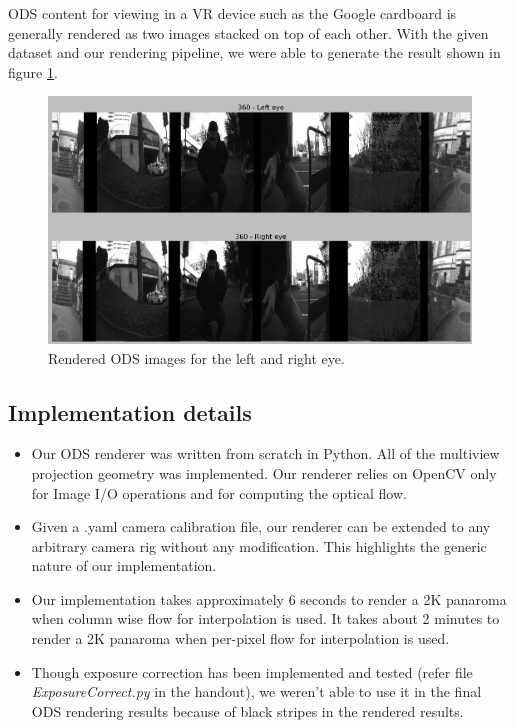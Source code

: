 \documentclass[10pt,twocolumn,letterpaper]{article}
\begin{document}
ODS content for viewing in a VR device such as the Google cardboard is generally rendered as two images stacked on top of each other.  With the given dataset and our rendering pipeline, we were able to generate the result shown in figure \ref{fig:left_right_eyecwise}.
\begin{figure}
\centering
\includegraphics[width=\linewidth]{../results/ODS-renderer-results/left-right-eye.png}
\caption{Rendered ODS images for the left and right eye.}
\label{fig:left_right_eyecwise}
\end{figure}

\subsection{Implementation details}
\begin{itemize}
\item Our ODS renderer was written from scratch in Python. All of the multiview projection geometry was implemented. Our renderer relies on OpenCV only for Image I/O operations and for computing the optical flow. 
\item Given a .yaml camera calibration file, our renderer can be extended to any arbitrary camera rig without any modification. This highlights the generic nature of our implementation. 
\item Our implementation takes approximately 6 seconds to render a 2K panaroma when column wise flow for interpolation is used. It takes about 2 minutes to render a 2K panaroma when per-pixel flow for interpolation is used. 
\item Though exposure correction has been implemented and tested (refer file \emph{ExposureCorrect.py} in the handout), we weren't able to use it in the final ODS rendering results because of black stripes in the rendered results. 
\end{itemize}
\end{document}
